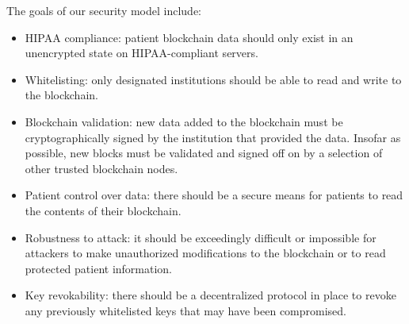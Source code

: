 \documentclass[12pt]{article}
\begin{document}
The goals of our security model include:
\begin{itemize}
\item HIPAA compliance: patient blockchain data should only exist in an unencrypted state on HIPAA-compliant servers.

\item Whitelisting: only designated institutions should be able to read and write to the blockchain.

\item Blockchain validation: new data added to the blockchain must be cryptographically signed by the institution that provided the data. Insofar as possible, new blocks must be validated and signed off on by a selection of other trusted blockchain nodes.

\item Patient control over data: there should be a secure means for patients to read the contents of their blockchain.

\item Robustness to attack: it should be exceedingly difficult or impossible for attackers to make unauthorized modifications to the blockchain or to read protected patient information.

\item Key revokability: there should be a decentralized protocol in place to revoke any previously whitelisted keys that may have been compromised.
\end{itemize}
\end{document}
